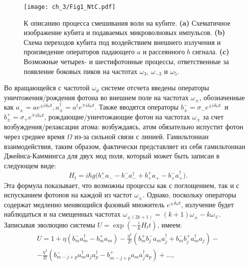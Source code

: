 \begin{figure}[htb]\center
	\texttt{[image: ch\_3/Fig1\_NtC.pdf]}
	\caption{К описанию процесса смешивания волн на кубите. \textbf{(a)} Схематичное изображение кубита и подаваемых микроволновых импульсов. \textbf{(b)} Схема переходов кубита под воздействием внешнего излучения и произведение операторов падающего $a$ и рассеянного $b$ сигнала. \textbf{(c)} Возможные четырех- и шестифотонные процессы, ответственные за появление боковых пиков на частотах $\omega_3$, $\omega_{-3}$ и $\omega_5$. }
	\label{fig: opers}	
\end{figure}
Во вращающейся с частотой $\omega_d$ системе отсчета введены операторы уничтожения/рождения фотона во внешнем поле на частотах $\omega_{\pm}$, обозначенные как $a_{\pm}=ae^{\pm i\delta\omega t}, a^{\dag}_{\pm} = a^{\dag}e^{\mp i\delta\omega t}$. Также вводятся операторы $b^-_{\pm}=\sigma_-e^{\pm i\delta\omega t}$~и~$b^+_{\pm}=\sigma_+ e^{\mp i\delta\omega t}$, рождающие/уничтожающие фотон на частотах $\omega_{\pm}$ за счет возбуждения/релаксации атома: возбуждаясь, атом обязательно испустит фотон через среднее время $\Omega$ из-за сильной связи с линией. Гамильтониан взаимодействия, таким образом, фактически представляет из себя гамильтониан Джейнса-Каммингса для двух мод поля, который  может быть записан в следующем виде:
\begin{equation}
H_t = i \hbar g\big(b_-^+ a_{-}  - b_-^-a^\dag_{-} + b_+^+ a_{+} - b^-_+ a^\dag_{+} \big).
\label{Hmb}
\end{equation}
Эта формула показывает, что возможны процессы как с поглощением, так и с испусканием фотонов на каждой из частот $\omega_{\pm}$. Однако, поскольку операторы содержат медленно меняющийся фазовый множитель $e^{\pm\delta\omega t}$, излучение будет наблюдаться и на смещенных частотах $\omega_{\pm(2k+1)} = (k+1)\omega_{\pm} - k\omega_{\mp}$. Записывая эволюцию системы $U = \exp(-\frac{i}{\hbar}H_t t)$, имеем:
\begin{equation}
\begin{split}
U =1 + \eta (b^-_m a^\dag_m - b^+_m a_m)  - \frac{\eta^2}{2!}(b^+_m b^-_j a_m a^\dag_j + b^-_m b^+_j a_m^{\dag} a_j)
- \\ - \frac{\eta^3}{3!} (b^-_{m-j+p} a^\dag_m a_j a^\dag_p - b^+_{m-j+p} a_m a_j^{\dag} a_p) +...,
\end{split}
\label{eq:ut2}
\end{equation}
